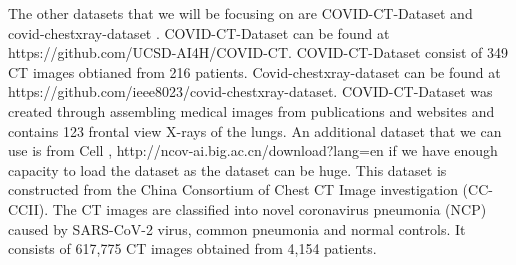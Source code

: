 The other datasets that we will be focusing on are COVID-CT-Dataset \cite{ref21} and covid-chestxray-dataset \cite{ref22}. COVID-CT-Dataset can be found at https://github.com/UCSD-AI4H/COVID-CT. COVID-CT-Dataset consist of 349 CT images obtianed from 216 patients. Covid-chestxray-dataset can be found at https://github.com/ieee8023/covid-chestxray-dataset. COVID-CT-Dataset  was created through assembling medical images from publications and websites and contains 123 frontal view X-rays of the lungs. An additional dataset that we can use is from Cell \cite{ref24}, http://ncov-ai.big.ac.cn/download?lang=en if we have enough capacity to load the dataset as the dataset can be huge. This dataset is constructed from the China Consortium of Chest CT Image investigation (CC-CCII). The CT images are classified into novel coronavirus pneumonia (NCP) caused by SARS-CoV-2 virus, common pneumonia and normal controls. It consists of 617,775 CT images obtained from 4,154 patients.

